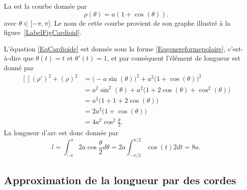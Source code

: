 \begin{example}
	La  est la courbe donnée par
	\begin{equation}        \label{EqCardioide}
		\rho(\theta)=a(1+\cos(\theta)).
	\end{equation}
	avec \( \theta\in\mathopen[ -\pi , \pi \mathclose]\). Le nom de cette courbe provient de son graphe illustré à la figure~\ref{LabelFigCardioid}.
	\newcommand{\CaptionFigCardioid}{Une cardioïde, \( \rho=1+\cos(\theta)\).}
	

	L'équation \eqref{EqCardioide} est donnée sous la forme \eqref{Eqgenereformepolaire}, c'est-à-dire que \( \theta(t)=t\) et \( \theta'(t)=1\), et par conséquent l'élément de longueur est donné par
	\begin{equation}
		\begin{aligned}[]
			(\rho')^2+(\rho)^2 & =\big( -a\sin(\theta) \big)^2+a^2\big( 1+\cos(\theta) \big)^2    \\
			                   & =a^2\sin^2(\theta)+a^2\big( 1+2\cos(\theta)+\cos^2(\theta) \big) \\
			                   & =a^2\big( 1+1+2\cos(\theta) \big)                                \\
			                   & =2a^2\big( 1+\cos(\theta) \big)                                  \\
			                   & =4a^2\cos^2\frac{ \theta }{2}.
		\end{aligned}
	\end{equation}
	La longueur d'arc est donc donnée par
	\begin{equation}
		l=\int_{-\pi}^{\pi}2a\cos\frac{ \theta }{2}d\theta=2a\int_{-\pi/2}^{\pi/2}\cos(t)2dt=8a.
	\end{equation}
\end{example}

\subsection{Approximation de la longueur par des cordes}

